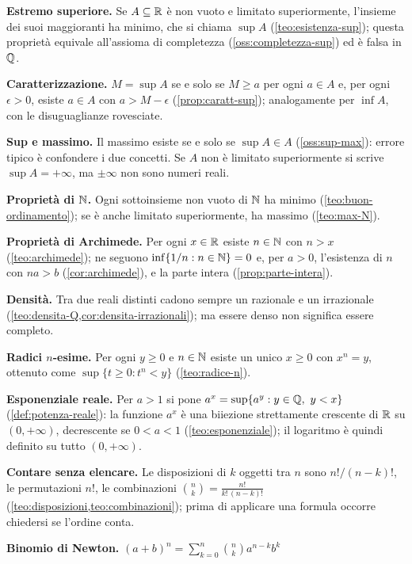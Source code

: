 \begin{puntichiave}
\item \textbf{Estremo superiore.} Se $A\subseteq\mathbb{R}$ è non vuoto e limitato superiormente,
l'insieme dei suoi maggioranti ha minimo, che si chiama $\sup A$
(\cref{teo:esistenza-sup}); questa proprietà equivale all'assioma di completezza
(\cref{oss:completezza-sup}) ed è falsa in $\mathbb{Q}$.
\item \textbf{Caratterizzazione.} $M=\sup A$ se e solo se $M\ge a$ per ogni $a\in A$ e,
per ogni $\epsilon>0$, esiste $a\in A$ con $a>M-\epsilon$ (\cref{prop:caratt-sup});
analogamente per $\inf A$, con le disuguaglianze rovesciate.
\item \textbf{Sup e massimo.} Il massimo esiste se e solo se $\sup A\in A$
(\cref{oss:sup-max}): errore tipico è confondere i due concetti. Se $A$ non è limitato
superiormente si scrive $\sup A=+\infty$, ma $\pm\infty$ non sono numeri reali.
\item \textbf{Proprietà di $\mathbb{N}$.} Ogni sottoinsieme non vuoto di $\mathbb{N}$ ha minimo
(\cref{teo:buon-ordinamento}); se è anche limitato superiormente, ha massimo
(\cref{teo:max-N}).
\item \textbf{Proprietà di Archimede.} Per ogni $x\in\mathbb{R}$ esiste $n\in\mathbb{N}$ con $n>x$
(\cref{teo:archimede}); ne seguono $\inf\{1/n : n\in\mathbb{N}\}=0$ e, per $a>0$, l'esistenza di
$n$ con $na>b$ (\cref{cor:archimede}), e la parte intera (\cref{prop:parte-intera}).
\item \textbf{Densità.} Tra due reali distinti cadono sempre un razionale e un
irrazionale (\cref{teo:densita-Q,cor:densita-irrazionali}); ma essere denso non
significa essere completo.
\item \textbf{Radici $n$-esime.} Per ogni $y\ge0$ e $n\in\mathbb{N}$ esiste un unico $x\ge0$ con
$x^{n}=y$, ottenuto come $\sup\{t\ge0 : t^{n}<y\}$ (\cref{teo:radice-n}).
\item \textbf{Esponenziale reale.} Per $a>1$ si pone
$a^{x}=\sup\{a^{y} : y\in\Q,\ y<x\}$ (\cref{def:potenza-reale}): la funzione $a^{x}$ è
una biiezione strettamente crescente di $\mathbb{R}$ su $(0,+\infty)$, decrescente se $0<a<1$
(\cref{teo:esponenziale}); il logaritmo è quindi definito su tutto $(0,+\infty)$.
\item \textbf{Contare senza elencare.} Le disposizioni di $k$ oggetti tra $n$ sono
$n!/(n-k)!$, le permutazioni $n!$, le combinazioni $\binom nk=\frac{n!}{k!\,(n-k)!}$
(\cref{teo:disposizioni,teo:combinazioni}); prima di applicare una formula occorre
chiedersi se l'ordine conta.
\item \textbf{Binomio di Newton.} $(a+b)^{n}=\sum_{k=0}^{n}\binom nk a^{n-k}b^{k}$

\end{puntichiave}
